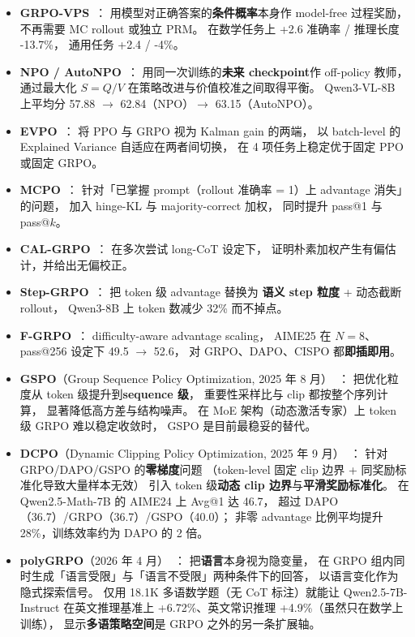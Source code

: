 \begin{itemize}[noitemsep]
  \item \textbf{GRPO-VPS}~\cite{grpovps2026}：
        用模型对正确答案的\textbf{条件概率}本身作 model-free 过程奖励，
        不再需要 MC rollout 或独立 PRM。
        在数学任务上 +2.6 准确率 / 推理长度 -13.7\%，
        通用任务 +2.4 / -4\%。
  \item \textbf{NPO / AutoNPO}~\cite{npo2026}：
        用同一次训练的\textbf{未来 checkpoint}作 off-policy 教师，
        通过最大化 $S = Q/V$ 在策略改进与价值校准之间取得平衡。
        Qwen3-VL-8B 上平均分 57.88 $\to$ 62.84（NPO）$\to$ 63.15（AutoNPO）。
  \item \textbf{EVPO}~\cite{evpo2026}：
        将 PPO 与 GRPO 视为 Kalman gain 的两端，
        以 batch-level 的 Explained Variance 自适应在两者间切换，
        在 4 项任务上稳定优于固定 PPO 或固定 GRPO。
  \item \textbf{MCPO}~\cite{mcpo2026}：
        针对「已掌握 prompt（rollout 准确率 = 1）上 advantage 消失」的问题，
        加入 hinge-KL 与 majority-correct 加权，
        同时提升 pass@1 与 pass@$k$。
  \item \textbf{CAL-GRPO}~\cite{calgrpo2026}：
        在多次尝试 long-CoT 设定下，
        证明朴素加权产生有偏估计，并给出无偏校正。
  \item \textbf{Step-GRPO}~\cite{stepgrpo2026}：
        把 token 级 advantage 替换为
        \textbf{语义 step 粒度} + 动态截断 rollout，
        Qwen3-8B 上 token 数减少 32\% 而不掉点。
  \item \textbf{F-GRPO}~\cite{zhang2026fgrpo}：
        difficulty-aware advantage scaling，
        AIME25 在 $N{=}8$、pass@256 设定下 49.5 $\to$ 52.6，
        对 GRPO、DAPO、CISPO 都\textbf{即插即用}。
  \item \textbf{GSPO}（Group Sequence Policy Optimization, 2025 年 8 月）~\cite{zheng2025gspo}：
        把优化粒度从 token 级提升到\textbf{sequence 级}，
        重要性采样比与 clip 都按整个序列计算，
        显著降低高方差与结构噪声。
        在 MoE 架构（动态激活专家）上 token 级 GRPO 难以稳定收敛时，
        GSPO 是目前最稳妥的替代。
  \item \textbf{DCPO}（Dynamic Clipping Policy Optimization, 2025 年 9 月）~\cite{yang2025dcpo}：
        针对 GRPO/DAPO/GSPO 的\textbf{零梯度}问题
        （token-level 固定 clip 边界 + 同奖励标准化导致大量样本无效）
        引入 token 级\textbf{动态 clip 边界}与\textbf{平滑奖励标准化}。
        在 Qwen2.5-Math-7B 的 AIME24 上 Avg@1 达 46.7，
        超过 DAPO（36.7）/GRPO（36.7）/GSPO（40.0）；
        非零 advantage 比例平均提升 28\%，训练效率约为 DAPO 的 2 倍。
  \item \textbf{polyGRPO}（2026 年 4 月）~\cite{wu2026polygrpo}：
        把\textbf{语言}本身视为隐变量，
        在 GRPO 组内同时生成「语言受限」与「语言不受限」两种条件下的回答，
        以语言变化作为隐式探索信号。
        仅用 18.1K 多语数学题（无 CoT 标注）就能让 Qwen2.5-7B-Instruct
        在英文推理基准上 +6.72\%、英文常识推理 +4.9\%（虽然只在数学上训练），
        显示\textbf{多语策略空间}是 GRPO 之外的另一条扩展轴。
\end{itemize}

